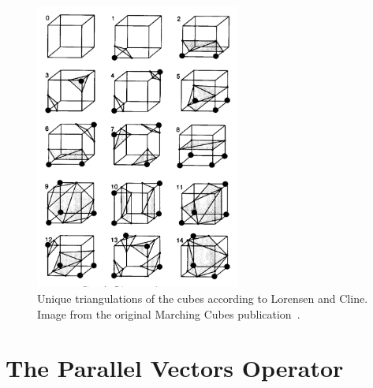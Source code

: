 \begin{figure}
  \centering
  \includegraphics[width=0.6\textwidth]{Images/MCTable.pdf}
  \caption{Unique triangulations of the cubes according to Lorensen and
  Cline. Image from the original Marching Cubes publication~\cite{MC}.}
  \label{fig:MCTable}
\end{figure}

\section{The Parallel Vectors Operator}\label{sec:PVO}

